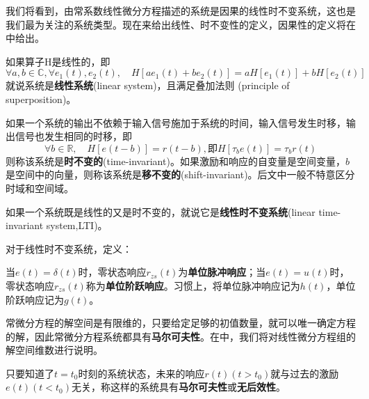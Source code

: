 我们将看到，由常系数线性微分方程描述的系统是因果的线性时不变系统，这也是我们最为关注的系统类型。现在来给出线性、时不变性的定义，因果性的定义将在中给出。

\begin{definition}[线性系统]
    \label{def:system_linear}
    如果算子H是线性的，即
\[\forall a,b\in\mathbb{C},\forall e_1(t),e_2(t),\quad H[ae_1(t)+be_2(t)]=aH[e_1(t)]+bH[e_2(t)]\]
就说系统是\textbf{线性系统}(linear system)，且满足叠加法则 (principle of superposition)。
\end{definition}

\begin{definition}[时不变性和移不变性]
    \label{def:time_invariant}
    如果一个系统的输出不依赖于输入信号施加于系统的时间，输入信号发生时移，输出信号也发生相同的时移，即
    $$\forall b\in\mathbb{R},\quad H[e(t-b)]=r(t-b),\text{即}H[\tau_b e(t)]=\tau_b r(t)$$
    则称该系统是\textbf{时不变的}(time-invariant)。如果激励和响应的自变量是空间变量，$b$是空间中的向量，则称该系统是\textbf{移不变的}(shift-invariant)。后文中一般不特意区分时域和空间域。
\end{definition}
\begin{definition}[线性时不变系统]
    \label{def:LTI}
    如果一个系统既是线性的又是时不变的，就说它是\textbf{线性时不变系统}(linear time-invariant system,LTI)。
\end{definition}

对于线性时不变系统，定义：

\begin{definition}[单位脉冲响应与单位阶跃响应]
    \label{def:unit_immpulse_response}
    当$e(t)=\delta(t)$时，零状态响应$r_{zs}(t)$为\textbf{单位脉冲响应}；当$e(t)=u(t)$时，零状态响应$r_{zs}(t)$称为\textbf{单位阶跃响应}。习惯上，将单位脉冲响应记为$h(t)$，单位阶跃响应记为$g(t)$。
\end{definition}

常微分方程的解空间是有限维的，只要给定足够的初值数量，就可以唯一确定方程的解，因此常微分方程系统都具有\textbf{马尔可夫性}。在中，我们将对线性微分方程组的解空间维数进行说明。

\begin{definition}[马尔可夫性]
    \label{def:system_markov}
    只要知道了$t=t_0$时刻的系统状态，未来的响应$r(t)(t>t_0)$就与过去的激励$e(t)(t<t_0)$无关，称这样的系统具有\textbf{马尔可夫性}或\textbf{无后效性}。
\end{definition}

